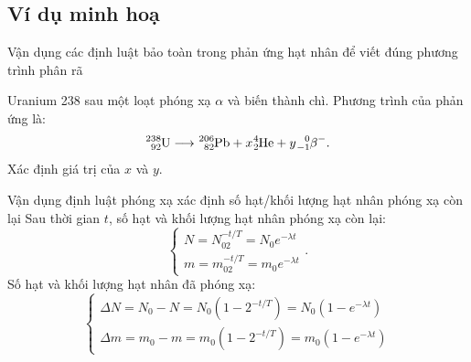 \subsection{Ví dụ minh hoạ}
\begin{dang}{Vận dụng các định luật bảo toàn trong phản ứng hạt nhân để viết đúng phương trình phân rã}
\end{dang}
\begin{vd}
	Uranium 238 sau một loạt phóng xạ $\alpha$ và biến thành chì. Phương trình của phản ứng là: $$\ce{^{238}_{92}U}\longrightarrow\ce{^{206}_{82}Pb}+x\ce{^4_2He}+y\ce{^0_{-1}\beta^{-}}.$$
	Xác định giá trị của $x$ và $y$.
\end{vd}
\begin{dang}{Vận dụng định luật phóng xạ xác định số hạt/khối lượng hạt nhân phóng xạ còn lại}
		Sau thời gian $t$, số hạt và khối lượng hạt nhân phóng xạ còn lại:
		\begin{equation}
			\begin{cases}
				N=N_02^{-t/T}=N_0e^{-\lambda t}\\
				m=m_02^{-t/T}=m_0e^{-\lambda t}
			\end{cases}.
		\end{equation}	
		Số hạt và khối lượng hạt nhân đã phóng xạ:
		\begin{equation}
			\begin{cases}
				\Delta N=N_0-N=N_0\left(1-2^{-t/T}\right)=N_0\left(1-e^{-\lambda t}\right)\\
				\Delta m=m_0-m=m_0\left(1-2^{-t/T}\right)=m_0\left(1-e^{-\lambda t}\right)
			\end{cases}
		\end{equation}
\end{dang}
